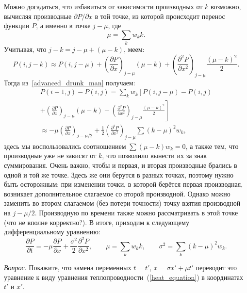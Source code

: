 \documentclass{book}
\begin{document}
Можно догадаться, что избавиться от зависимости производных от $k$ возможно, вычисляя производные
$\partial P / \partial x$ в той точке, из которой происходит перенос функции $P$, а именно в точке
$j - \mu$, где
\begin{equation}
    \mu = \sum_k w_k k.
\end{equation}
Учитывая, что $j - k = j - \mu + (\mu - k)$, меем:
\begin{equation}
    P(i, j - k) \approx P(i, j - \mu) + \left( \frac{\partial P}{\partial x} \right)_{j - \mu} (\mu
    - k) + \left( \frac{\partial^2 P}{\partial x^2} \right)_{j - \mu} \frac{(\mu - k)^2}{2}.
\end{equation}
Тогда из~\ref{advanced_drunk_man} получаем:
\begin{multline}
    P(i + 1, j) - P(i, j) = \sum_k w_k \left[ P(i, j - \mu) - P(i, j) \right. \\
    \left. + \left( \frac{\partial P}{\partial x} \right)_{j - \mu} (\mu - k) + \left(
    \frac{\partial^2 P}{\partial x^2} \right)_{j - \mu} \frac{(\mu - k)^2}{2} \right] \\
    \approx -\mu \left( \frac{\partial P}{\partial x} \right)_{j - \mu/2} + \frac{1}{2} \left(
    \frac{\partial^2 P}{\partial x^2} \right)_{j - \mu} \sum (k - \mu)^2 w_k,
\end{multline}
здесь мы воспользовались соотношением $\sum (\mu - k) w_k = 0$, а также тем, что производные уже не
зависят от $k$, что позволило вынести их за знак суммирования. Очень важно, чтобы и первая, и
вторая производные брались в одной и той же точке. Здесь же они берутся в разных точках, поэтому
нужно быть осторожным:
при изменении точки, в которой берётся первая
производная, возникает дополнительное слагаемое со второй производной. Однако можно заменить во
втором слагаемом (без потери точности) точку взятия производной на $j - \mu/2$. Производную по
времени также можно рассматривать в этой точке (что не вполне корректно?). В итоге, приходим к
следующему дифференциальному уравнению:
\begin{equation}
    \label{heat_equation_mu_sigma}
    \frac{\partial P}{\partial t} = -\mu \frac{\partial P}{\partial x} + \frac{\sigma^2}{2}
    \frac{\partial^2 P}{\partial x^2}, \qquad \mu = \sum_k w_k k, \qquad \sigma^2 = \sum_k  (k -
    \mu)^2 w_k.
\end{equation}

\textit{Вопрос}. Покажите, что замена переменных $t = t'$, $x = \sigma x' + \mu t'$ переводит это
уравнение к виду уравнения теплопроводности~(\ref{heat_equation}) в координатах $t'$ и $x'$.
\end{document}
